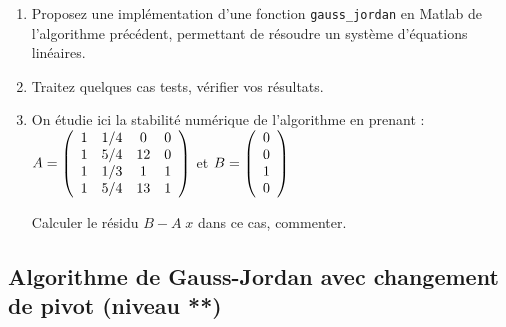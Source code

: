 \documentclass[a4paper, 10pt]{article}
\newcommand{\insertlisting}[2]
  {\begin{itemize}\item[]\end{itemize}}
\begin{document}
\begin{enumerate} 
 \item Proposez une implémentation d'une fonction {\tt gauss\_jordan} en Matlab
 de l'algorithme précédent, permettant de résoudre un système d'équations linéaires.
 
 \item Traitez quelques cas tests,  vérifier vos résultats.

\item On étudie ici la stabilité numérique de l'algorithme en prenant :\\
$A=\left(
\begin{array}{c c c c}
1  & 1/4   &   0 & 0  \\
1  & 5/4   & 12 & 0   \\
1  & 1/3  &  1   & 1  \\
1 & 5/4  & 13  &  1  
\end{array}
\right)$
et $B=\left(
\begin{array}{c c c c}
0  \\
0    \\
1  \\
0  
\end{array}
\right)$

Calculer le résidu $B-A\; x$ dans ce cas, commenter.
 
%

\end{enumerate}
 
\subsection{Algorithme de Gauss-Jordan avec changement de pivot (niveau **)}
\end{document}
